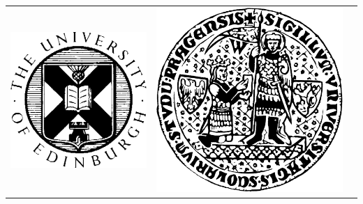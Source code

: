 \documentclass[landscape]{uedslides2C}
\begin{document}
\vspace{5mm}
\begin{table}[h]
\begin{center}
\begin{tabular}{ c  c  c } 

\includegraphics[scale=0.3]{univ-edinburgh.pdf}
&
\includegraphics[scale=0.07]{charles.png}

\end{tabular}
\end{center}
\end{table}
\end{document}
